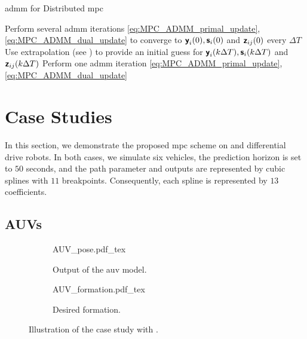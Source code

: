 \begin{algorithm}[t]
    \caption{\gls{admm} for Distributed \gls{mpc}}\label{alg:admm}
    \begin{algorithmic}[1]
         Perform several \gls{admm} iterations \eqref{eq:MPC_ADMM_primal_update}, \eqref{eq:MPC_ADMM_dual_update} to converge to $\boldsymbol{\mathsf{y}}_i(0), \boldsymbol{\mathsf{s}}_i(0)$ and $\boldsymbol{\mathsf{z}}_{ij}(0)$
         every $\Delta T$
            \State Use extrapolation (see ) to provide an initial guess for ${\boldsymbol{\mathsf{y}}}_i(k\Delta T), {\boldsymbol{\mathsf{s}}}_i(k\Delta T)$ and ${\boldsymbol{\mathsf{z}}}_{ij}(k\Delta T)$
            \State Perform one \gls{admm} iteration \eqref{eq:MPC_ADMM_primal_update}, \eqref{eq:MPC_ADMM_dual_update}
        \EndFor
    \end{algorithmic}
\end{algorithm}



\section{Case Studies}
\label{sec:MPC_case_studies}


In this section, we demonstrate the proposed \gls{mpc} scheme on  and differential drive robots.
In both cases, we simulate six vehicles, the prediction horizon is set to $50$ seconds, and the path parameter and outputs are represented by cubic splines with $11$ breakpoints.
Consequently, each spline is represented by $13$ coefficients.

\subsection{AUVs}
\label{sec:MPC_case_study_AUV}

\begin{figure}[b]
    \centering
    \begin{subfigure}[t]{0.35\textwidth}
        \centering
        \def\svgwidth{\textwidth}
        {AUV_pose.pdf_tex}
        \caption{Output of the \gls{auv} model.}
        \label{fig:MPC_AUV_pose}        
    \end{subfigure}
    \hspace*{0.15\textwidth}
    \begin{subfigure}[t]{0.35\textwidth}
        \centering
        \def\svgwidth{\textwidth}
        {AUV_formation.pdf_tex}
        \caption{Desired formation.}
        \label{fig:MPC_AUV_formation}
    \end{subfigure}
    \caption{Illustration of the case study with .}
\end{figure}

